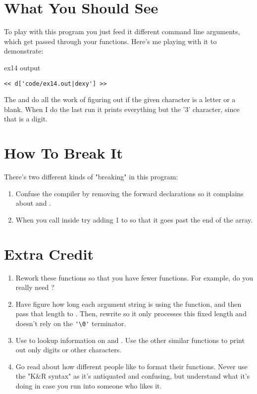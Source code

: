 \section{What You Should See}

To play with this program you just feed it different command line 
arguments, which get passed through your functions.  Here's me
playing with it to demonstrate:

\begin{code}{ex14 output}
\begin{lstlisting}
<< d['code/ex14.out|dexy'] >>
\end{lstlisting}
\end{code}

The  and  do all the work of figuring
out if the given character is a letter or a blank.  When I do the
last run it prints everything but the '3' character, since that 
is a digit.

\section{How To Break It}

There's two different kinds of "breaking" in this program:

\begin{enumerate}
\item Confuse the compiler by removing the forward declarations
    so it complains about  and .
\item When you call  inside  try
    adding 1 to  so that it goes past the end of the
     array.
\end{enumerate}


\section{Extra Credit}

\begin{enumerate}
\item Rework these functions so that you have fewer functions.  For example,
    do you really need ?
\item Have  figure how long each argument string
    is using the  function, and then pass that length
    to .  Then, rewrite  
    so it only processes this fixed length and doesn't rely on the
    \verb|'\0'| terminator.
\item Use  to lookup information on 
    and .  Use the other similar functions to
    print out only digits or other characters.
\item Go read about how different people like to format their
    functions.  Never use the "K&R syntax" as it's antiquated and
    confusing, but understand what it's doing in case you run
    into someone who likes it.
\end{enumerate}

